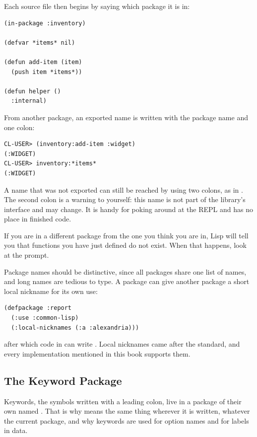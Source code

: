 Each source file then begins by saying which package it is in:

\begin{verbatim}
(in-package :inventory)

(defvar *items* nil)

(defun add-item (item)
  (push item *items*))

(defun helper ()
  :internal)
\end{verbatim}

From another package, an exported name is written with the package
name and one colon:

\begin{verbatim}
CL-USER> (inventory:add-item :widget)
(:WIDGET)
CL-USER> inventory:*items*
(:WIDGET)
\end{verbatim}

A name that was not exported can still be reached by using two
colons, as in . The second colon is a warning to
yourself: this name is not part of the library's interface and may
change. It is handy for poking around at the REPL and has no place in
finished code.

If you are in a different package from the one you think you are in,
Lisp will tell you that functions you have just defined do not exist.
When that happens, look at the prompt.

Package names should be distinctive, since all packages share one list
of names, and long names are tedious to type. A package can give
another package a short local nickname for its own use:

\begin{verbatim}
(defpackage :report
  (:use :common-lisp)
  (:local-nicknames (:a :alexandria)))
\end{verbatim}

\noindent
after which code in  can write . Local
nicknames came after the standard, and every implementation mentioned
in this book supports them.

\subsection{The Keyword Package}

Keywords, the symbols written with a leading colon, live in a package
of their own named . That is why  means the
same thing wherever it is written, whatever the current package, and
why keywords are used for option names and for labels in data.

